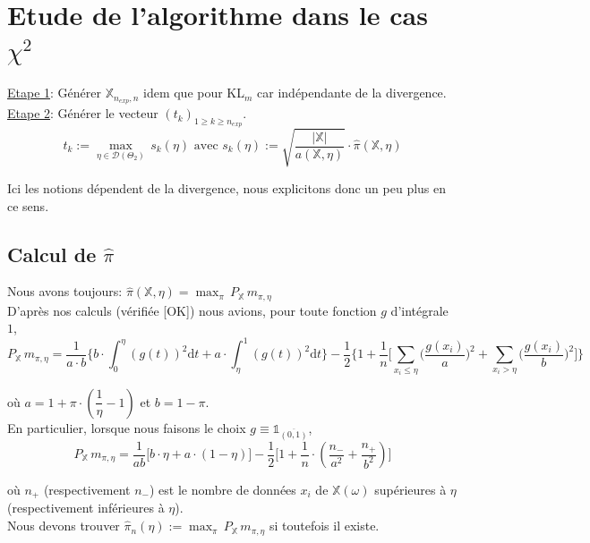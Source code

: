 \documentclass{article}
\begin{document}
    \section{Etude de l'algorithme dans le cas $\chi^2$}

    \underline{Etape 1}: Générer $\mathbb{X}_{n_{exp},n}$ idem que pour KL$_m$ car indépendante de la divergence. \\

    \underline{Etape 2}: Générer le vecteur $(t_k)_{1\geq k\geq n_{exp}}$. \\

    $$ t_k := \max_{\eta\in\mathcal{D}(\Theta_2)}\, s_k(\eta) \mbox{ avec } s_k(\eta) := \sqrt{\dfrac{|\mathbb{X}|}{a(\mathbb{X},\eta)}}\cdot\hat\pi(\mathbb{X},\eta)$$

    Ici les notions dépendent de la divergence, nous explicitons donc un peu plus en ce sens. \\

    \subsection{Calcul de $\hat\pi$}

    Nous avons toujours: $\hat\pi(\mathbb{X},\eta) = \max_\pi\, P_\mathbb{X}\, m_{\pi,\eta}$ \\

    D'après nos calculs {\color{green} (vérifiée }[OK]{\color{green})} nous avions, pour toute fonction $g$ d'intégrale $1$,
    $$ P_\mathbb{X}\,m_{\pi,\eta} = \dfrac{1}{a\cdot{}b}\Big\{b\cdot\int_0^\eta(g(t))^2\mathrm{d}t + a\cdot\int_\eta^1(g(t))^2\mathrm{d}t\Big\} - \dfrac{1}{2}\Big\{ 1 + \dfrac{1}{n}\Big[ \sum_{x_i\leq\eta} \Big(\dfrac{g(x_i)}{a}\Big)^2 + \sum_{x_i>\eta}\Big(\dfrac{g(x_i)}{b}\Big)^2 \Big]\Big\}$$

    où $a=1+\pi\cdot(\dfrac{1}{\eta}-1)$ et $b=1-\pi$. \\

    En particulier, lorsque nous faisons le choix $g\equiv\mathbb{1}_{\overline{(0,1)}}$,
    $$ P_{\mathbb{X}}\, m_{\pi,\eta} = \dfrac{1}{ab}\Big[ b\cdot\eta + a\cdot(1-\eta)\Big] - \dfrac{1}{2}\Big[ 1 + \dfrac{1}{n}\cdot(\dfrac{n_-}{a^2} + \dfrac{n_+}{b^2})\Big] $$

    où $n_+$ (respectivement $n_-$) est le nombre de données $x_i$ de $\mathbb{X}(\omega)$ supérieures à $\eta$ (respectivement inférieures à $\eta$).\\ 
    
    Nous devons trouver $\hat\pi_n(\eta) := \max_\pi\, P_{\mathbb{X}}\, m_{\pi,\eta}$ si toutefois il existe. \\
\end{document}
